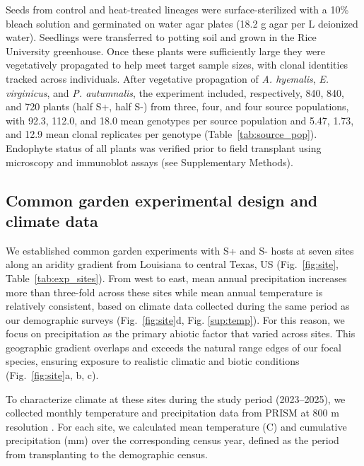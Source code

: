 \documentclass[12pt]{article}\usepackage[]{graphicx}\usepackage[dvipsnames]{xcolor}
\begin{document}
Seeds from control and heat-treated lineages were surface-sterilized with a 10\% bleach solution and germinated on water agar plates (18.2 g agar per L deionized water).
Seedlings were transferred to potting soil and grown in the Rice University greenhouse. 
Once these plants were sufficiently large they were vegetatively propagated to help meet target sample sizes, with clonal identities tracked across individuals. 
After vegetative propagation of \textit{A. hyemalis}, \textit{E. virginicus}, and \textit{P. autumnalis}, the experiment included, respectively, 840, 840, and 720 plants (half S+, half S-) from three, four, and four source populations, with 92.3, 112.0, and 18.0 mean genotypes per source population and 5.47, 1.73, and 12.9 mean clonal replicates per genotype (Table~\ref{tab:source_pop}). 
Endophyte status of all plants was verified prior to field transplant using microscopy and immunoblot assays (see Supplementary Methods).

\subsection*{Common garden experimental design and climate data}
We established common garden experiments with S+ and S- hosts at seven sites along an aridity gradient from Louisiana to central Texas, US (Fig.~\ref{fig:site}, Table~\ref{tab:exp_sites}).
From west to east, mean annual precipitation increases more than three-fold across these sites while mean annual temperature is relatively consistent, based on climate data collected during the same period as our demographic surveys (Fig.~\ref{fig:site}d, Fig. \ref{sup:temp}).
For this reason, we focus on precipitation as the primary abiotic factor that varied across sites.  
This geographic gradient overlaps and exceeds the natural range edges of our focal species, ensuring exposure to realistic climatic and biotic conditions (Fig.~\ref{fig:site}a, b, c). 

To characterize climate at these sites during the study period (2023–2025), we collected monthly temperature and precipitation data from PRISM at 800 m resolution \citep{PRISM2024}. 
For each site, we calculated mean temperature (\textdegree C) and cumulative precipitation (mm) over the corresponding census year, defined as the period from transplanting to the demographic census.
\end{document}
